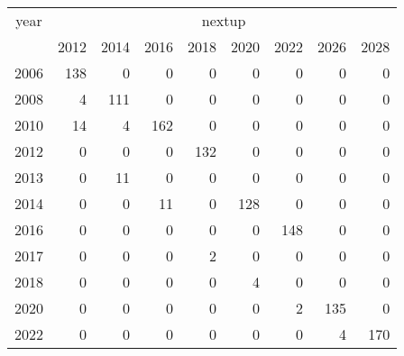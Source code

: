 \footnotesize\begin{tabular}[t]{lrrrrrrrr}
\toprule
\multicolumn{1}{c}{year} & \multicolumn{8}{c}{nextup} \\
\cmidrule(l{3pt}r{3pt}){1-1} \cmidrule(l{3pt}r{3pt}){2-9}
  & 2012 & 2014 & 2016 & 2018 & 2020 & 2022 & 2026 & 2028\\
\midrule
2006 & 138 & 0 & 0 & 0 & 0 & 0 & 0 & 0\\
2008 & 4 & 111 & 0 & 0 & 0 & 0 & 0 & 0\\
2010 & 14 & 4 & 162 & 0 & 0 & 0 & 0 & 0\\
2012 & 0 & 0 & 0 & 132 & 0 & 0 & 0 & 0\\
2013 & 0 & 11 & 0 & 0 & 0 & 0 & 0 & 0\\
2014 & 0 & 0 & 11 & 0 & 128 & 0 & 0 & 0\\
2016 & 0 & 0 & 0 & 0 & 0 & 148 & 0 & 0\\
2017 & 0 & 0 & 0 & 2 & 0 & 0 & 0 & 0\\
2018 & 0 & 0 & 0 & 0 & 4 & 0 & 0 & 0\\
2020 & 0 & 0 & 0 & 0 & 0 & 2 & 135 & 0\\
2022 & 0 & 0 & 0 & 0 & 0 & 0 & 4 & 170\\
\bottomrule
\end{tabular}
